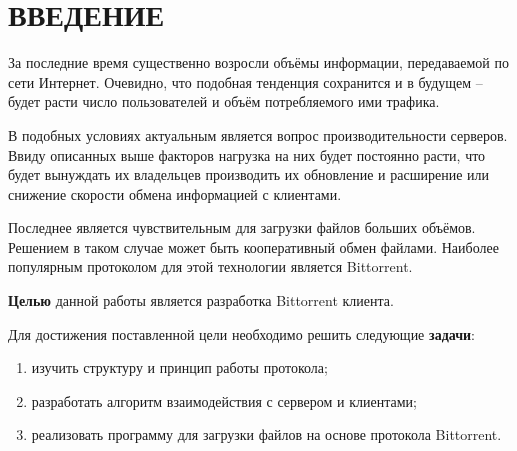 \section*{ВВЕДЕНИЕ}

За последние время существенно возросли объёмы информации, передаваемой по сети Интернет. Очевидно, что подобная тенденция сохранится и в будущем -- будет расти число пользователей и объём потребляемого ими трафика.

В подобных условиях актуальным является вопрос производительности серверов. Ввиду описанных выше факторов нагрузка на них будет постоянно расти, что будет вынуждать их владельцев производить их обновление и расширение или снижение скорости обмена информацией с клиентами.

Последнее является чувствительным для загрузки файлов больших объёмов. Решением в таком случае может быть кооперативный обмен файлами. Наиболее популярным протоколом для этой технологии является Bittorrent.

\textbf{Целью} данной работы является разработка Bittorrent клиента.

Для достижения поставленной цели необходимо решить следующие \textbf{задачи}:
\begin{enumerate}
	\item изучить структуру и принцип работы протокола;
	
	\item разработать алгоритм взаимодействия с сервером и клиентами;
	
	\item реализовать программу для загрузки файлов на основе протокола Bittorrent.
\end{enumerate}